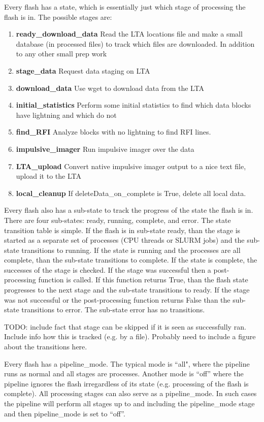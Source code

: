 \documentclass[]{article}
\begin{document}
Every flash has a state, which is essentially just which stage of processing the flash is in. The possible stages are:
\begin{enumerate}
	\item \textbf{ready\_download\_data} Read the LTA locations file and make a small database (in processed files) to track which files are downloaded. In addition to any other small prep work
	\item \textbf{stage\_data} Request data staging on LTA
	\item \textbf{download\_data} Use wget to download data from the LTA
	\item \textbf{initial\_statistics} Perform some initial statistics to find which data blocks have lightning and which do not
	\item \textbf{find\_RFI} Analyze blocks with no lightning to find RFI lines.
	\item \textbf{impulsive\_imager} Run impulsive imager over the data
	\item \textbf{LTA\_upload} Convert native impulsive imager output to a nice text file, upload it to the LTA
	\item \textbf{local\_cleanup} If deleteData\_on\_complete is True, delete all local data.
\end{enumerate}

Every flash also has a sub-state to track the progress of the state the flash is in. There are four sub-states: ready, running, complete, and error. The state transition table is simple. If the flash is in sub-state ready, than the stage is started as a separate set of processes  (CPU threads or SLURM jobs) and the sub-state transitions to running. If the state is running and the processes are all complete, than the sub-state transitions to complete. If the state is complete, the successes of the stage is checked. If the stage was successful then a post-processing function is called. If this function returns True, than the flash state progresses to the next stage and the sub-state transitions to ready. If the stage was not successful or the post-processing function returns False than the sub-state transitions to error. The sub-state error has no transitions.

TODO: include fact that stage can be skipped if it is seen as successfully ran. Include info how this is tracked (e.g. by a file). Probably need to include a figure about the transitions here. 

Every flash has a pipeline\_mode. The typical mode is ``all", where the pipeline runs as normal and all stages are processes. Another mode is ``off'' where the pipeline ignores the flash irregardless of its state (e.g. processing of the flash is complete). All processing stages can also serve as a pipeline\_mode. In such cases the pipeline will perform all stages up to and including the pipeline\_mode stage and then pipeline\_mode is set to ``off''. 
\end{document}
